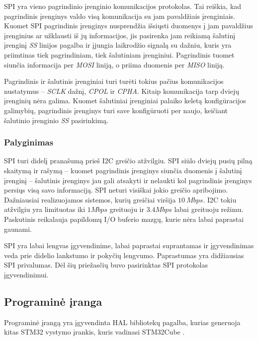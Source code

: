 SPI yra vieno pagrindinio įrenginio komunikacijos protokolas.
Tai reiškia, kad pagrindinis įrenginys valdo visą komunikacija su jam pavaldžiais įrenginiais.
Kuomet SPI pagrindinis įrenginys nusprendžia išsiųsti duomenys į jam pavaldžius įrenginius ar užklausti iš jų informacijos, jis pasirenka jam reikiamą šalutinį įrenginį \textit{SS} linijos pagalba ir įjungia laikrodžio signalą su dažniu, kuris yra priimtinas tiek pagrindiniam, tiek šalutiniam įrenginiui.
Pagrindinis tuomet siunčia informacija per \textit{MOSI} liniją, o priima duomenis per \textit{MISO} liniją.

Pagrindinis ir šalutinis įrenginiai turi turėti tokius pačius komunikacijos nustatymus -- \textit{SCLK} dažnį, \textit{CPOL} ir \textit{CPHA}.
Kitaip komunikacija tarp dviejų įrenginių nėra galima.
Kuomet šalutiniai įrenginiai palaiko keletą konfigūracijos galimybių, pagrindinis įrenginys turi save konfigūruoti per naujo, keičiant šalutinio įrenginio \textit{SS} pasirinkimą.

\subsubsection{Palyginimas}

SPI turi didelį pranašumą prieš I2C greičio atžvilgiu. SPI siūlo dviejų pusių pilną skaitymą ir rašymą -- kuomet pagrindinis įrenginys siunčia duomenis į šalutinį įrenginį -- šalutinis įrenginys jau gali atsakyti ir nelaukti kol pagrindinis įrenginys persiųs visą savo informaciją.
SPI neturi visiškai jokio greičio apribojimo.
Dažniausiai realizuojamos sistemos, kurių greičiai viršija $10~Mbps$.
I2C tokiu atžvilgiu yra limituotas iki $1Mbps$ greituoju ir $3.4Mbps$ labai greituoju režimu.
Paskutinis reikalauja papildomų I/O buferio mazgų, kurie nėra labai paprastai gaunami.

SPI yra labai lengvas įgyvendinime, labai paprastai suprantamas ir įgyvendinimas veda prie didelio lankstumo ir pokyčių lengvumo.
Paprastumas yra didžiausias SPI privalumas.
Dėl šių priežasčių buvo pasirinktas SPI protokolas įgyvendinimui.

\subsection{Programinė įranga}

Programinė įrangą yra įgyvendinta HAL bibliotekų pagalba, kurias generuoja kitas STM32 vystymo įrankis, kuris vadinasi STM32Cube \cite{STM3293:online}.

